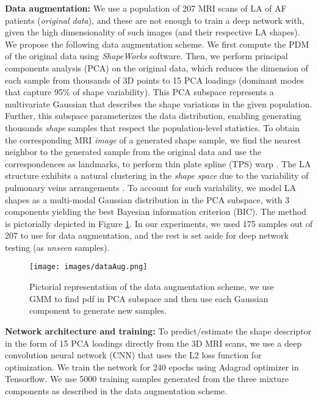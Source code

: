\documentclass[twocolumn]{cinc}
\begin{document}
\vspace{0.05in}
\noindent\textbf{Data augmentation: }
We use a population of 207 MRI scans of LA of AF patients (\textit{original data}), and these are not enough to train a deep network with, given the high dimensionality of such images (and their respective LA shapes).
We propose the following data augmentation scheme. We first compute the PDM of the original data using \emph{ShapeWorks} \cite{cates2017shapeworks} software. Then, we perform principal components analysis (PCA) on the original data, which reduces the dimension of each sample from thousands of 3D points to 15 PCA loadings (dominant modes that capture 95\% of shape variability). This PCA subspace represents a multivariate Gaussian that describes the shape variations in the given population. Further, this subspace parameterizes the data distribution, enabling generating thousands \textit{shape} samples that respect the population-level statistics. To obtain the corresponding MRI \textit{image} of a generated shape sample, we find the nearest neighbor to the generated sample from the original data and use the correspondences as landmarks, to perform thin plate spline (TPS) warp \cite{bookstein1989principal}. 
The LA structure exhibits a natural clustering in the \emph{shape space} due to the variability of pulmonary veins arrangements  \cite{sohns2011mdct}. To account for such variability, we model LA shapes as a multi-modal Gaussian distribution in the PCA subspace, with 3 components yielding the best Bayesian information criterion (BIC). The method is pictorially depicted in Figure \ref{fig:data-augmentation}.
In our experiments, we used 175 samples out of 207 to use for data augmentation, and the rest is set aside for deep network testing (as \textit{unseen} samples). 
\begin{figure}
\centering
\texttt{[image: images/dataAug.png]}
\vspace{-0.2in}
\caption{Pictorial representation of the data augmentation scheme, we use GMM to find pdf in PCA subspace and then use each Gaussian component to generate new samples.}
\vspace{-0.2in}
\label{fig:data-augmentation}	
\end{figure}


\vspace{0.05in}
\noindent\textbf{Network architecture and training: }
To predict/estimate the shape descriptor in the form of 15 PCA loadings directly from the 3D MRI scans, we use a deep convolution neural network (CNN) \cite{lecun1998cnn} that uses the L2 loss function for optimization. We train the network for 240 epochs using Adagrad optimizer in Tensorflow. We use 5000 training samples generated from the three mixture components as described in the data augmentation scheme. 
\end{document}
